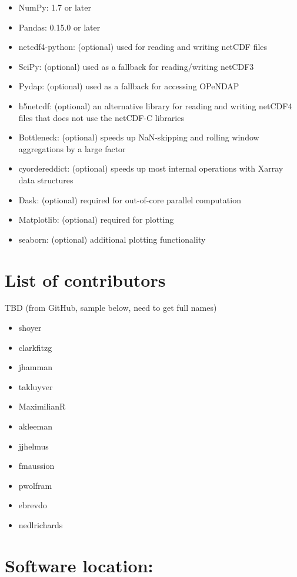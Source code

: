 \documentclass{jors}
\begin{document}
\begin{itemize}
\item NumPy: 1.7 or later
\item Pandas: 0.15.0 or later
\item netcdf4-python: (optional) used for reading and writing netCDF files
\item SciPy: (optional) used as a fallback for reading/writing netCDF3
\item Pydap: (optional) used as a fallback for accessing OPeNDAP
\item h5netcdf: (optional) an alternative library for reading and writing netCDF4 files that does not use the netCDF-C libraries
\item Bottleneck: (optional) speeds up NaN-skipping and rolling window aggregations by a large factor
\item cyordereddict: (optional) speeds up most internal operations with Xarray data structures
\item Dask: (optional) required for out-of-core parallel computation
\item Matplotlib: (optional) required for plotting
\item seaborn: (optional) additional plotting functionality
\end{itemize}


\section*{List of contributors}

TBD (from GitHub, sample below, need to get full names)

\begin{itemize}
	\item shoyer
	\item clarkfitzg
	\item jhamman
	\item takluyver
	\item MaximilianR
	\item akleeman
	\item jjhelmus
	\item fmaussion
	\item pwolfram
	\item ebrevdo
	\item nedlrichards
\end{itemize}

\section*{Software location:}
\end{document}
